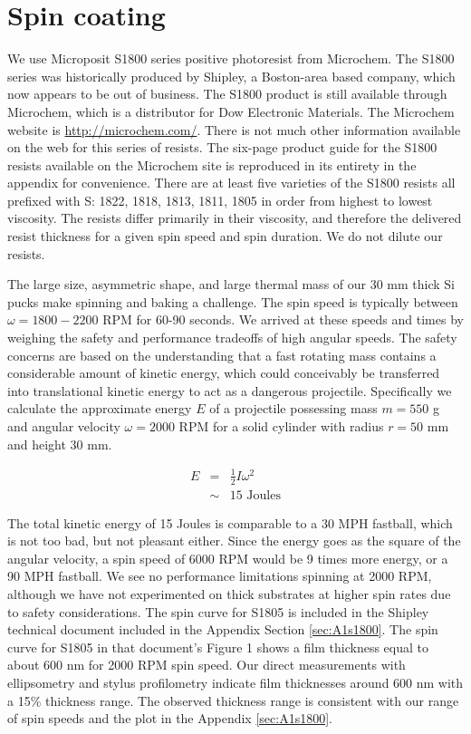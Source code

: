 \section{Spin coating}
We use Microposit S1800 series positive photoresist from Microchem.  The S1800 series was historically produced by Shipley, a Boston-area based company, which now appears to be out of business.  The S1800 product is still available through Microchem, which is a distributor for Dow Electronic Materials.  The Microchem website is \url{http://microchem.com/}.  There is not much other information available on the web for this series of resists.  The six-page product guide for the S1800 resists available on the Microchem site is reproduced in its entirety in the appendix for convenience.  There are at least five varieties of the S1800 resists all prefixed with S: 1822, 1818, 1813, 1811, 1805 in order from highest to lowest viscosity.  The resists differ primarily in their viscosity, and therefore the delivered resist thickness for a given spin speed and spin duration.  We do not dilute our resists.

The large size, asymmetric shape, and large thermal mass of our 30 mm thick Si pucks make spinning and baking a challenge.  The spin speed is typically between $\omega=1800-2200$ RPM for 60-90 seconds.  We arrived at these speeds and times by weighing the safety and performance tradeoffs of high angular speeds.  The safety concerns are based on the understanding that a fast rotating mass contains a considerable amount of kinetic energy, which could conceivably be transferred into translational kinetic energy to act as a dangerous projectile.  Specifically we calculate the approximate energy $E$ of a projectile possessing mass $m=550$ g and angular velocity $\omega=2000$ RPM for a solid cylinder with radius $r=50$ mm and height 30 mm.

\begin{eqnarray}
       E&=&\frac{1}{2}I \omega^2 \nonumber \\
		&\sim&15 \textrm{ Joules} \nonumber
\end{eqnarray}

The total kinetic energy of 15 Joules is comparable to a 30 MPH fastball, which is not too bad, but not pleasant either.  Since the energy goes as the square of the angular velocity, a spin speed of 6000 RPM would be 9 times more energy, or a 90 MPH fastball.  We see no performance limitations spinning at 2000 RPM, although we have not experimented on thick substrates at higher spin rates due to safety considerations.  The spin curve for S1805 is included in the Shipley technical document included in the Appendix Section \ref{sec:A1s1800}.  The spin curve for S1805 in that document's Figure 1 shows a film thickness equal to about 600 nm for 2000 RPM spin speed.  Our direct measurements with ellipsometry and stylus profilometry indicate film thicknesses around 600 nm with a 15\% thickness range.  The observed thickness range is consistent with our range of spin speeds and the plot in the Appendix \ref{sec:A1s1800}.


